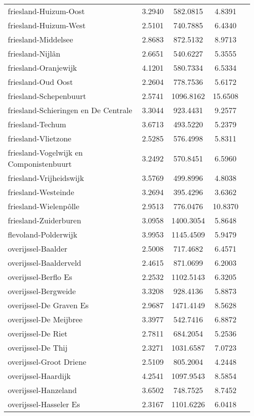 \begin{longtable}{llccc}
friesland-Huizum-Oost & 3.2940 & 582.0815 & 4.8391 \\
friesland-Huizum-West & 2.5101 & 740.7885 & 6.4340 \\
friesland-Middelsee & 2.8683 & 872.5132 & 8.9713 \\
friesland-Nijlân & 2.6651 & 540.6227 & 5.3555 \\
friesland-Oranjewijk & 4.1201 & 580.7334 & 6.5334 \\
friesland-Oud Oost & 2.2604 & 778.7536 & 5.6172 \\
friesland-Schepenbuurt & 2.5741 & 1096.8162 & 15.6508 \\
friesland-Schieringen en De Centrale & 3.3044 & 923.4431 & 9.2577 \\
friesland-Techum & 3.6713 & 493.5220 & 5.2379 \\
friesland-Vlietzone & 2.5285 & 576.4998 & 5.8311 \\
friesland-Vogelwijk en Componistenbuurt & 3.2492 & 570.8451 & 6.5960 \\
friesland-Vrijheidswijk & 3.5769 & 499.8996 & 4.8038 \\
friesland-Westeinde & 3.2694 & 395.4296 & 3.6362 \\
friesland-Wielenpôlle & 2.9513 & 776.0476 & 10.8370 \\
friesland-Zuiderburen & 3.0958 & 1400.3054 & 5.8648 \\
flevoland-Polderwijk & 3.9953 & 1145.4509 & 5.9479 \\
overijssel-Baalder & 2.5008 & 717.4682 & 6.4571 \\
overijssel-Baalderveld & 2.4615 & 871.0699 & 6.2003 \\
overijssel-Berflo Es & 2.2532 & 1102.5143 & 6.3205 \\
overijssel-Bergweide & 3.3208 & 928.4136 & 5.8873 \\
overijssel-De Graven Es & 2.9687 & 1471.4149 & 8.5628 \\
overijssel-De Meijbree & 3.3977 & 542.7416 & 6.8872 \\
overijssel-De Riet & 2.7811 & 684.2054 & 5.2536 \\
overijssel-De Thij & 2.3271 & 1031.6587 & 7.0723 \\
overijssel-Groot Driene & 2.5109 & 805.2004 & 4.2448 \\
overijssel-Haardijk & 4.2541 & 1097.9543 & 8.5854 \\
overijssel-Hanzeland & 3.6502 & 748.7525 & 8.7452 \\
overijssel-Hasseler Es & 2.3167 & 1101.6226 & 6.0418 \\

\end{longtable}

